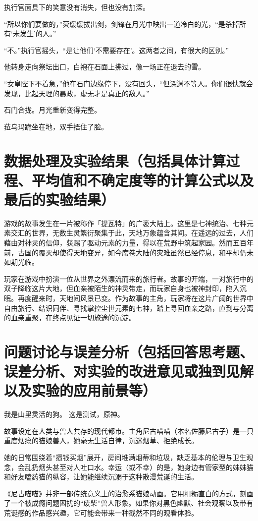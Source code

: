 \documentclass{SICNU_Experiment}
\begin{document}
执行官面具下的笑意没有消失，但也没有加深。

“所以你们要做的，”荧缓缓拔出剑，剑锋在月光中映出一道冷白的光，“是杀掉所有‘未发生’的人。”

“不。”执行官摇头，“是让他们‘不需要存在’。这两者之间，有很大的区别。”

他转身走向祭坛出口，白袍在石面上拂过，像一场正在退去的雪。

“女皇陛下不着急，”他在石门边缘停下，没有回头，“但深渊不等人。你们很快就会发现，比起天理的暴政，虚无才是真正的敌人。”

石门合拢。月光重新变得完整。

菈乌玛跪坐在地，双手捂住了脸。
\newpage
\section{\Large 数据处理及实验结果\mdseries \normalsize（包括具体计算过程、平均值和不确定度等的计算公式以及最后的实验结果）}
游戏的故事发生在一片被称作「提瓦特」的广袤大陆上。这里是七神统治、七种元素交汇的世界，无数生灵繁衍聚集于此，天地万象蕴含其间。在遥远的过去，人们藉由对神灵的信仰，获赐了驱动元素的力量，得以在荒野中筑起家园。然而五百年前，古国的覆灭却使得天地变异，如今席卷大陆的灾难虽然已经停息，和平却仍未如期光临。

玩家在游戏中扮演一位从世界之外漂流而来的旅行者。故事的开端，一对旅行中的双子降临这片大地，但血亲被陌生的神灵带走，而玩家自身也被神封印，陷入沉眠。再度醒来时，天地间风景已变。作为故事的主角，玩家将在这片广阔的世界中自由旅行、结识同伴、寻找掌控尘世元素的七神，踏上寻回血亲之路，直到与分离的血亲重聚，在终点见证一切旅途的沉淀。
\newpage
\section{\Large 问题讨论与误差分析\mdseries \normalsize（包括回答思考题、误差分析、对实验的改进意见或独到见解以及实验的应用前景等）}
我是山里灵活的狗。
这是测试，原神。

故事设定在人类与兽人共存的现代都市。主角尼古喵喵（本名佐藤尼古子）是一只重度烟瘾的猫娘兽人，她毫无生活自律，沉迷烟草、拒绝成长。

她的日常围绕着“攒钱买烟”展开，房间堆满烟蒂和垃圾，缺乏基本的伦理与卫生观念，会乱扔烟头甚至对人吐口水。幸运（或不幸）的是，她身边有管家型的妹妹猫和好友嗑药猫的纵容，让她能继续沉溺于这种散漫荒诞的生活。

《尼古喵喵》并非一部传统意义上的治愈系猫娘动画。它用粗粝直白的方式，刻画了一个被成瘾问题困扰的“废柴”兽人形象。如果你对黑色幽默、社会观察以及带有荒诞感的作品感兴趣，它可能会带来一种截然不同的观看体验。
\end{document}
